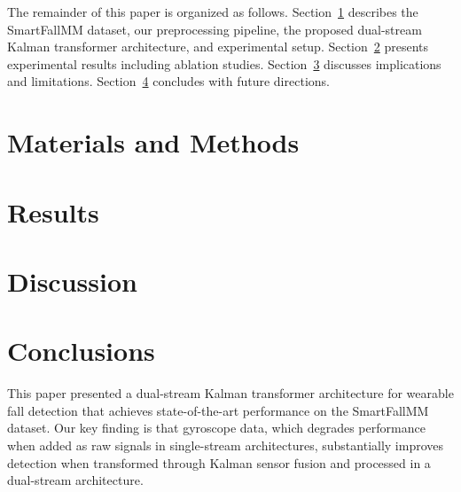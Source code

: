 \documentclass[journal,article,submit,pdftex,moreauthors]{../Definitions/mdpi}
\begin{document}
The remainder of this paper is organized as follows. Section~\ref{sec:materials} describes the SmartFallMM dataset, our preprocessing pipeline, the proposed dual-stream Kalman transformer architecture, and experimental setup. Section~\ref{sec:results} presents experimental results including ablation studies. Section~\ref{sec:discussion} discusses implications and limitations. Section~\ref{sec:conclusions} concludes with future directions.

\section{Materials and Methods}
\label{sec:materials}



\section{Results}
\label{sec:results}



\section{Discussion}
\label{sec:discussion}



\section{Conclusions}
\label{sec:conclusions}

This paper presented a dual-stream Kalman transformer architecture for wearable fall detection that achieves state-of-the-art performance on the SmartFallMM dataset. Our key finding is that gyroscope data, which degrades performance when added as raw signals in single-stream architectures, substantially improves detection when transformed through Kalman sensor fusion and processed in a dual-stream architecture.
\end{document}
